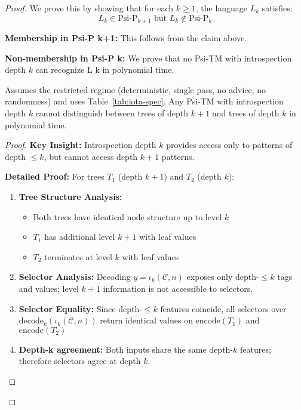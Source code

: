 \begin{proof}
We prove this by showing that for each $k \geq 1$, the language $L_k$ satisfies:
$$L_k \in \text{Psi-P}_{k+1} \text{ but } L_k \notin \text{Psi-P}_k$$

\textbf{Membership in Psi-P k+1:}
This follows from the claim above.

\textbf{Non-membership in Psi-P k:}
We prove that no Psi-TM with introspection depth $k$ can recognize L k in polynomial time.

\begin{lemma}
\label{lem:depth-k-limitation-1}
Assumes the restricted regime (deterministic, single pass, no advice, no randomness) and uses Table~\ref{tab:iota-spec}.
Any Psi-TM with introspection depth $k$ cannot distinguish between trees of depth $k+1$ and trees of depth $k$ in polynomial time.
\end{lemma}

\begin{proof}
\textbf{Key Insight:} Introspection depth $k$ provides access only to patterns of depth $\leq k$, but cannot access depth $k+1$ patterns.

\textbf{Detailed Proof:}
For trees $T_1$ (depth $k+1$) and $T_2$ (depth $k$):

\begin{enumerate}
\item \textbf{Tree Structure Analysis:}
  \begin{itemize}
  \item Both trees have identical node structure up to level $k$
  \item $T_1$ has additional level $k+1$ with leaf values
  \item $T_2$ terminates at level $k$ with leaf values
  \end{itemize}

\item \textbf{Selector Analysis:}
  Decoding $y=\iota_k(\mathcal{C},n)$ exposes only depth-$\le k$ tags and values; level $k{+}1$ information is not accessible to selectors.

\item \textbf{Selector Equality:}
  Since depth-$\le k$ features coincide, all selectors over $\mathrm{decode}_k(\iota_k(\mathcal{C},n))$ return identical values on $\text{encode}(T_1)$ and $\text{encode}(T_2)$

\item \textbf{Depth-k agreement:}
  Both inputs share the same depth-$k$ features; therefore selectors agree at depth $k$.


\end{enumerate}
\end{proof}
\end{proof}
